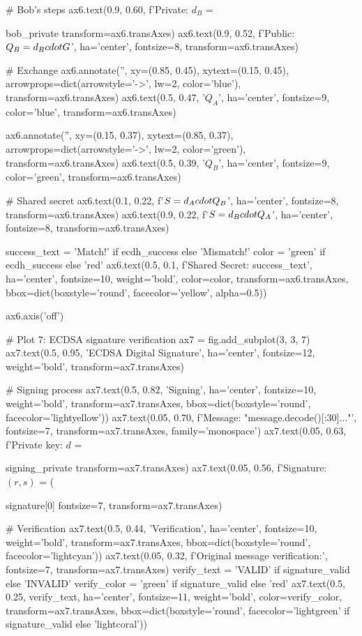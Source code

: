 \documentclass[a4paper, 11pt]{article}
\begin{document}
\begin{pycode}
{# Bob's steps
ax6.text(0.9, 0.60, f'Private: $d_B$ = {bob_private %
         transform=ax6.transAxes)
ax6.text(0.9, 0.52, f'Public: $Q_B = d_B \\cdot G$', ha='center', fontsize=8,
         transform=ax6.transAxes)

# Exchange
ax6.annotate('', xy=(0.85, 0.45), xytext=(0.15, 0.45),
            arrowprops=dict(arrowstyle='->', lw=2, color='blue'),
            transform=ax6.transAxes)
ax6.text(0.5, 0.47, '$Q_A$', ha='center', fontsize=9, color='blue',
         transform=ax6.transAxes)

ax6.annotate('', xy=(0.15, 0.37), xytext=(0.85, 0.37),
            arrowprops=dict(arrowstyle='->', lw=2, color='green'),
            transform=ax6.transAxes)
ax6.text(0.5, 0.39, '$Q_B$', ha='center', fontsize=9, color='green',
         transform=ax6.transAxes)

# Shared secret
ax6.text(0.1, 0.22, f'$S = d_A \\cdot Q_B$', ha='center', fontsize=8,
         transform=ax6.transAxes)
ax6.text(0.9, 0.22, f'$S = d_B \\cdot Q_A$', ha='center', fontsize=8,
         transform=ax6.transAxes)

success_text = 'Match!' if ecdh_success else 'Mismatch!'
color = 'green' if ecdh_success else 'red'
ax6.text(0.5, 0.1, f'Shared Secret: {success_text}', ha='center', fontsize=10,
         weight='bold', color=color, transform=ax6.transAxes,
         bbox=dict(boxstyle='round', facecolor='yellow', alpha=0.5))

ax6.axis('off')

# Plot 7: ECDSA signature verification
ax7 = fig.add_subplot(3, 3, 7)
ax7.text(0.5, 0.95, 'ECDSA Digital Signature', ha='center', fontsize=12, weight='bold',
         transform=ax7.transAxes)

# Signing process
ax7.text(0.5, 0.82, 'Signing', ha='center', fontsize=10, weight='bold',
         transform=ax7.transAxes, bbox=dict(boxstyle='round', facecolor='lightyellow'))
ax7.text(0.05, 0.70, f'Message: "{message.decode()[:30]}..."', fontsize=7,
         transform=ax7.transAxes, family='monospace')
ax7.text(0.05, 0.63, f'Private key: $d$ = {signing_private %
         transform=ax7.transAxes)
ax7.text(0.05, 0.56, f'Signature: $(r, s)$ = ({signature[0] %
         fontsize=7, transform=ax7.transAxes)

# Verification
ax7.text(0.5, 0.44, 'Verification', ha='center', fontsize=10, weight='bold',
         transform=ax7.transAxes, bbox=dict(boxstyle='round', facecolor='lightcyan'))
ax7.text(0.05, 0.32, f'Original message verification:', fontsize=7,
         transform=ax7.transAxes)
verify_text = 'VALID' if signature_valid else 'INVALID'
verify_color = 'green' if signature_valid else 'red'
ax7.text(0.5, 0.25, verify_text, ha='center', fontsize=11, weight='bold',
         color=verify_color, transform=ax7.transAxes,
         bbox=dict(boxstyle='round', facecolor='lightgreen' if signature_valid else 'lightcoral'))

}}}}
\end{pycode}
\end{document}
